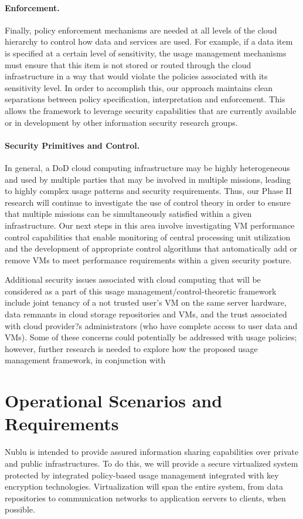 \documentclass[10pt,letterpaper]{article}
\begin{document}
\paragraph{Enforcement.} Finally, policy enforcement mechanisms are needed at all levels of the cloud hierarchy to control how data and services are used. For example, if a data item is specified at a certain level of sensitivity, the usage management mechanisms must ensure that this item is not stored or routed through the cloud infrastructure in a way that would violate the policies associated with its sensitivity level. In order to accomplish this, our approach maintains clean separations between policy specification, interpretation and enforcement. This allows the framework to leverage security capabilities that are currently available or in development by other information security research groups.

\paragraph{Security Primitives and Control.} In general, a DoD cloud computing infrastructure may be highly heterogeneous and used by multiple parties that may be involved in multiple missions, leading to highly complex usage patterns and security requirements. Thus, our Phase II research will continue to investigate the use of control theory in order to ensure that multiple missions can be simultaneously satisfied within a given infrastructure. Our next steps in this area involve investigating VM performance control capabilities that enable monitoring of central processing unit utilization and the development of appropriate control algorithms that automatically add or remove VMs to meet performance requirements within a given security posture.

Additional security issues associated with cloud computing that will be considered as a part of this usage management/control-theoretic framework include joint tenancy of a not trusted user's VM on the same server hardware, data remnants in cloud storage repositories and VMs, and the trust associated with cloud provider?s administrators (who have complete access to user data and VMs). Some of these concerns could potentially be addressed with usage policies; however, further research is needed to explore how the proposed usage management framework, in conjunction with

\section{Operational Scenarios and Requirements}
\label{section:req-scen}
Nublu is intended to provide assured information sharing capabilities over private and public infrastructures.  To do this, we will provide a secure virtualized system protected by integrated policy-based usage management integrated with key encryption technologies.  Virtualization will span the entire system, from data repositories to communication networks to application servers to clients, when possible.
\end{document}
